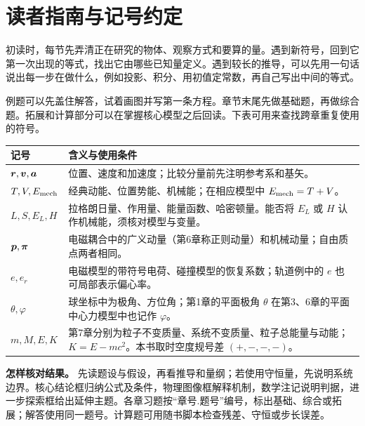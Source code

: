 \chapter*{读者指南与记号约定}
{}

初读时，每节先弄清正在研究的物体、观察方式和要算的量。遇到新符号，回到它第一次出现的等式，找出它由哪些已知量定义。遇到较长的推导，可以先用一句话说出每一步在做什么，例如投影、积分、用初值定常数，再自己写出中间的等式。

例题可以先盖住解答，试着画图并写第一条方程。章节末尾先做基础题，再做综合题。拓展和计算部分可以在掌握核心模型之后回读。下表可用来查找跨章重复使用的符号。

\medskip
\begin{center}
\begin{tabular}{@{}p{3.3cm}p{10.7cm}@{}}
\toprule
记号 & 含义与使用条件\\
\midrule
$\boldsymbol{r},\boldsymbol{v},\boldsymbol{a}$ & 位置、速度和加速度；比较分量前先注明参考系和基矢。\\
$T,V,E_{\rm mech}$ & 经典动能、位置势能、机械能；在相应模型中 $E_{\rm mech}=T+V$。\\
$L,S,E_L,H$ & 拉格朗日量、作用量、能量函数、哈密顿量。能否将 $E_L$ 或 $H$ 认作机械能，须核对模型与变量。\\
$\boldsymbol{p},\boldsymbol{\pi}$ & 电磁耦合中的广义动量（第6章称正则动量）和机械动量；自由质点两者相同。\\
$e,e_r$ & 电磁模型的带符号电荷、碰撞模型的恢复系数；轨道例中的 $e$ 也可局部表示偏心率。\\
$\theta,\varphi$ & 球坐标中为极角、方位角；第1章的平面极角 $\theta$ 在第3、6章的平面中心力模型中也记作 $\varphi$。\\
$m,M,E,K$ & 第7章分别为粒子不变质量、系统不变质量、粒子总能量与动能；$K=E-mc^2$。本书取时空度规号差 $(+,-,-,-)$。\\
\bottomrule
\end{tabular}
\end{center}

\textbf{怎样核对结果。}
先读题设与假设，再看推导和量纲；若使用守恒量，先说明系统边界。核心结论框归纳公式及条件，物理图像框解释机制，数学注记说明判据，进一步探索框给出延伸主题。各章习题按“章号.题号”编号，标出基础、综合或拓展；解答使用同一题号。计算题可用随书脚本检查残差、守恒或步长误差。
